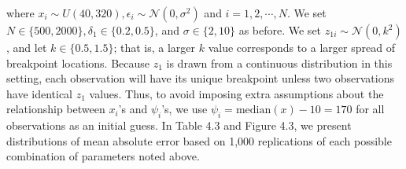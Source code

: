 \documentclass [12pt, proquest] {uwthesis}[2016/11/22]
\begin{document}
where $x_i \sim U(40, 320), \epsilon_i \sim \mathcal{N}(0, \sigma^2)$ and $i = 1, 2, \cdots, N$. We set $N \in \{500, 2000\}, \delta_1 \in \{0.2, 0.5\}$, and $\sigma \in \{2, 10\}$ as before. We set $z_{1i} \sim \mathcal{N}(0, k^2)$, and let $k \in \{0.5, 1.5\}$; that is, a larger $k$ value corresponds to a larger spread of breakpoint locations. Because $z_1$ is drawn from a continuous distribution in this setting, each observation will have its unique breakpoint unless two observations have identical $z_1$ values. Thus, to avoid imposing extra assumptions about the relationship between $x_i$'s and $\psi_i$'s, we use $\psi_i = \text{median}(x) - 10 = 170$ for all observations as an initial guess. In Table 4.3 and Figure 4.3, we present distributions of mean absolute error based on 1,000 replications of each possible combination of parameters noted above.
\end{document}
